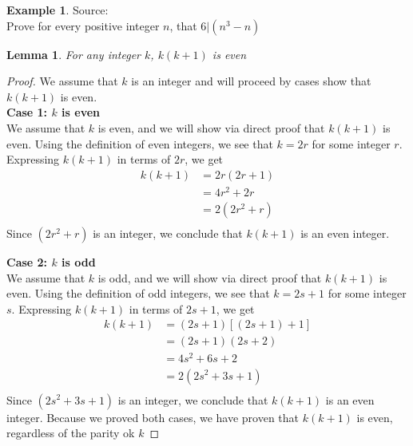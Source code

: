 \documentclass{book}
\newtheorem{lemma}[theorem]{Lemma}
\theoremstyle{definition}
\newtheorem{example}{Example}[definition]
\theoremstyle{remark}
\begin{document}
\newpage
\begin{example}
Source: \cite[Chap.6, S.6.3, Result 6.16]{gray} \\ 

Prove for every positive integer $n$, that $6 | (n^3 - n)$

\begin{tcolorbox}
    \begin{lemma}
    \label{dfd1}
        For any integer $k$, $k(k+1)$ is even
    \end{lemma}
\end{tcolorbox}

\begin{proof}
    We assume that $k$ is an integer and will proceed by cases show that $k(k+1)$ is even. \\
    
    \textbf{Case 1: $k$ is even} \\
        We assume that $k$ is even, and we will show via direct proof that $k(k+1)$ is even. Using the definition of even integers, we see that $k = 2r$ for some integer $r$. Expressing $k(k+1)$ in terms of $2r$, we get
            \begin{align*}
                k(k+1) & = 2r(2r + 1) \\
                    & = 4r^2 + 2r \\
                    & = 2(2r^2 + r) \\
            \end{align*}
        Since $(2r^2 + r)$ is an integer, we conclude that $k(k+1)$ is an even integer.
    
    \textbf{Case 2: $k$ is odd} \\
        We assume that $k$ is odd, and we will show via direct proof that $k(k+1)$ is even. Using the definition of odd integers, we see that $k = 2s+1$ for some integer $s$. Expressing $k(k+1)$ in terms of $2s + 1$, we get
            \begin{align*}
                k(k+1) & = (2s+1)[(2s+1) + 1] \\
                    & = (2s+1)(2s+2) \\
                    & = 4s^2 + 6s + 2 \\
                    & = 2(2s^2 + 3s + 1) \\
            \end{align*}
        Since $(2s^2 + 3s + 1)$ is an integer, we conclude that $k(k+1)$ is an even integer.
    Because we proved both cases, we have proven that $k(k+1)$ is even, regardless of the parity ok $k$
\end{proof}





\end{example}
\end{document}
